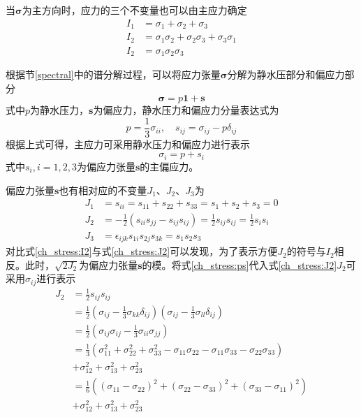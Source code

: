 当$\boldsymbol \sigma$为主方向时，应力的三个不变量也可以由主应力确定
\begin{subequations}
\begin{align}
    I_1 &= \sigma_{1} + \sigma_{2} + \sigma_{3} \\
    I_2 &= \sigma_{1}\sigma_{2} + \sigma_{2}\sigma_{3} + \sigma_{3}\sigma_{1} \label{ch_stress:I2} \\
    I_2 &= \sigma_{1}\sigma_{2}\sigma_{3}
\end{align}
\end{subequations} \par
根据节\ref{spectral}中的谱分解过程，可以将应力张量$\boldsymbol \sigma$分解为静水压部分和偏应力部分
\begin{equation}\label{ch_stress:decompose}
\boldsymbol \sigma = p \boldsymbol 1 + \boldsymbol s
\end{equation}
式中$p$为静水压力，$\boldsymbol s$为偏应力，静水压力和偏应力分量表达式为
\begin{equation}\label{ch_stress:ps}
p = \frac{1}{3} \sigma_{ii}, \quad s_{ij} = \sigma_{ij} - p \delta_{ij}
\end{equation}
根据上式可得，主应力可采用静水压力和偏应力进行表示
\begin{equation}
\sigma_i = p + s_i
\end{equation}
式中$s_i,i=1,2,3$为偏应力张量$\boldsymbol s$的主偏应力。\par
偏应力张量$\boldsymbol s$也有相对应的不变量$J_1$、$J_2$、$J_3$为
\begin{subequations}
\begin{align}
    J_1 &= s_{ii} = s_{11} + s_{22} + s_{33} = s_1 + s_2 + s_3 = 0 \\
    J_2 &= - \frac{1}{2}(s_{ii}s_{jj} - s_{ij}s_{ij}) = \frac{1}{2} s_{ij} s_{ij} = \frac{1}{2} s_i s_i  \label{ch_stress:J2} \\
    J_3 &= \epsilon_{ijk}s_{1i}s_{2j}s_{3k} = s_1 s_2 s_3
\end{align}
\end{subequations}
对比式\eqref{ch_stress:I2}与式\eqref{ch_stress:J2}可以发现，为了表示方便$J_2$的符号与$I_2$相反。此时，$\sqrt{2J_2}$为偏应力张量$\boldsymbol s$的模。将式\eqref{ch_stress:ps}代入式\eqref{ch_stress:J2}$J_2$可采用$\sigma_{ij}$进行表示
\begin{equation}
\begin{split}
    J_2 &= \frac{1}{2} s_{ij} s_{ij} \\
    &= \frac{1}{2} (\sigma_{ij}-\frac{1}{3}\sigma_{kk}\delta_{ij})(\sigma_{ij}-\frac{1}{3}\sigma_{ll}\delta_{ij}) \\
    &= \frac{1}{2}(\sigma_{ij}\sigma_{ij} - \frac{1}{3}\sigma_{ii}\sigma_{jj}) \\
    &= \frac{1}{3}(\sigma_{11}^2 + \sigma_{22}^2 + \sigma_{33}^2 - \sigma_{11}\sigma_{22} - \sigma_{11}\sigma_{33} - \sigma_{22}\sigma_{33}) \\ &+ \sigma_{12}^2 + \sigma_{13}^2 + \sigma_{23}^2 \\
    &= \frac{1}{6}((\sigma_{11} - \sigma_{22})^2 + (\sigma_{22}-\sigma_{33})^2 + (\sigma_{33}-\sigma_{11})^2) \\ &+ \sigma_{12}^2 + \sigma_{13}^2 + \sigma_{23}^2
\end{split}
\end{equation}
